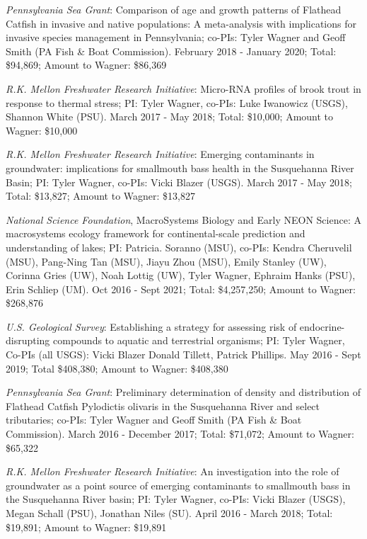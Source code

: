 \documentclass[10pt]{article}
\begin{document}
\begin{flushleft}
\begin{etaremune}
\item {\sl Pennsylvania Sea Grant}: Comparison of age and growth patterns of Flathead Catfish in invasive and native populations: A meta-analysis with implications for invasive species management in Pennsylvania; co-PIs: Tyler Wagner and Geoff Smith (PA Fish \& Boat Commission). February 2018 - January 2020; Total: \$94,869;  Amount to Wagner: \$86,369

\item {\sl  R.K. Mellon Freshwater Research Initiative}: Micro-RNA profiles of brook trout in response to thermal stress; PI: Tyler Wagner, co-PIs: Luke Iwanowicz (USGS), Shannon White (PSU). March 2017 - May 2018; Total: \$10,000; Amount to Wagner: \$10,000

\item {\sl  R.K. Mellon Freshwater Research Initiative}: Emerging contaminants in groundwater: implications for smallmouth bass health in the Susquehanna River Basin; PI: Tyler Wagner, co-PIs: Vicki Blazer (USGS). March 2017 - May 2018; Total: \$13,827; Amount to Wagner: \$13,827

\item {\sl National Science Foundation}, MacroSystems Biology and Early NEON Science: A macrosystems ecology framework for continental-scale prediction and understanding of lakes; PI: Patricia. Soranno (MSU), co-PIs: Kendra Cheruvelil (MSU), Pang-Ning Tan (MSU), Jiayu Zhou (MSU), Emily Stanley (UW), Corinna Gries (UW), Noah Lottig (UW), Tyler Wagner, Ephraim Hanks (PSU), Erin Schliep (UM). Oct 2016 - Sept 2021; Total: \$4,257,250; Amount to Wagner: \$268,876

\item {\sl U.S. Geological Survey}: Establishing a strategy for assessing risk of endocrine-disrupting compounds to aquatic and terrestrial organisms; PI: Tyler Wagner, Co-PIs (all USGS): Vicki Blazer Donald Tillett, Patrick Phillips. May 2016 - Sept 2019; Total \$408,380;  Amount to Wagner: \$408,380

\item {\sl Pennsylvania Sea Grant}: Preliminary determination of density and distribution of Flathead Catfish Pylodictis olivaris in the Susquehanna River and select tributaries; co-PIs: Tyler Wagner and Geoff Smith (PA Fish \& Boat Commission). March 2016 - December 2017; Total: \$71,072;  Amount to Wagner: \$65,322

\item {\sl  R.K. Mellon Freshwater Research Initiative}: An investigation into the role of groundwater as a point source of emerging contaminants to smallmouth bass in the Susquehanna River basin; PI: Tyler Wagner, co-PIs: Vicki Blazer (USGS), Megan Schall (PSU), Jonathan Niles (SU). April 2016 - March 2018; Total: \$19,891; Amount to Wagner: \$19,891


\end{etaremune}
\end{flushleft}
\end{document}
